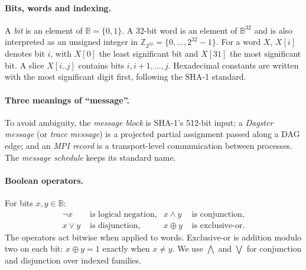 \documentclass[11pt,a4paper]{article}
\begin{document}
\paragraph{Bits, words and indexing.}
A \emph{bit} is an element of $\mathbb B=\{0,1\}$. A 32-bit word is an element of
$\mathbb B^{32}$ and is also interpreted as an unsigned integer in
$\mathbb Z_{2^{32}}=\{0,\ldots,2^{32}-1\}$. For a word $X$, $X[i]$ denotes bit $i$, with
$X[0]$ the least significant bit and $X[31]$ the most significant bit. A slice
$X[i..j]$ contains bits $i,i+1,\ldots,j$. Hexadecimal constants are written with the most
significant digit first, following the SHA-1 standard.

\paragraph{Three meanings of ``message''.} To avoid ambiguity, the \emph{message block} is SHA-1's
512-bit input; a \emph{Dagster message} (or \emph{trace message}) is a projected partial assignment
passed along a DAG edge; and an \emph{MPI record} is a transport-level communication between
processes. The \emph{message schedule} keeps its standard name.

\paragraph{Boolean operators.}
For bits $x,y\in\mathbb B$:
\begin{align*}
\neg x &\text{ is logical negation}, &
 x\wedge y &\text{ is conjunction},\\
 x\vee y &\text{ is disjunction}, &
 x\oplus y &\text{ is exclusive-or}.
\end{align*}
The operators act bitwise when applied to words. Exclusive-or is addition modulo two on each bit:
$x\oplus y=1$ exactly when $x\ne y$. We use $\bigwedge$ and $\bigvee$ for conjunction and
disjunction over indexed families.
\end{document}
